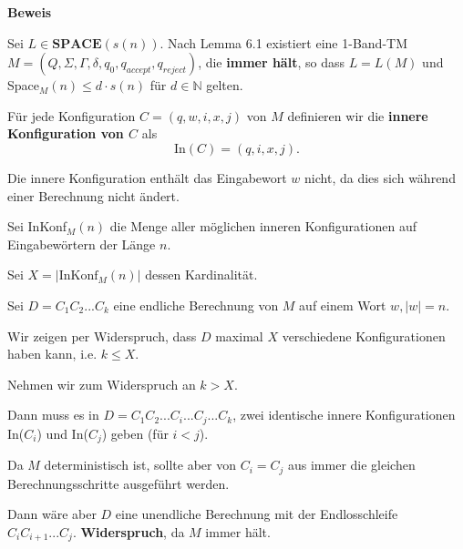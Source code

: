 \documentclass[a4paper, 11pt]{article}
\def\N{\mathbb{N}}
\begin{document}
                            \textbf{Beweis}
                        
                            Sei $L \in \textbf{SPACE}(s(n))$. Nach Lemma 6.1 existiert eine 1-Band-TM 
                            $M=(Q,\Sigma,\Gamma,\delta,q_0,q_{accept},q_{reject})$, die \textbf{immer hält}, 
                            so dass $L = L(M)$ und Space$_M(n) \leq d \cdot s(n)$ für $d \in \N$ gelten. 
                         
                            Für jede Konfiguration $C =(q,w,i,x,j)$ von $M$ definieren wir die 
                            \textbf{innere Konfiguration von $C$} als $$\text{In}(C) = (q,i,x,j).$$ 
                            
                            
                            Die innere Konfiguration enthält das Eingabewort $w$ nicht, da dies sich während einer Berechnung nicht ändert. 
                        
                            Sei InKonf$_M(n)$ die Menge aller möglichen inneren Konfigurationen auf Eingabewörtern der Länge $n$.
                        
                            Sei $X = |\text{InKonf}_M(n)|$ dessen Kardinalität.
                        
                            
                            Sei $D = C_1C_2...C_k$ eine endliche Berechnung von $M$ auf einem Wort $w, |w|=n$.
                        
                            
                            Wir zeigen per Widerspruch, dass $D$ maximal $X$ verschiedene Konfigurationen haben kann, i.e. $k \leq X$.
                        
                            
                            Nehmen wir zum Widerspruch an $k > X$.
                        
                            
                            Dann muss es in $D = C_1C_2...C_i...C_j...C_k$, zwei identische innere Konfigurationen In($C_i$) und In($C_j$) geben (für $i < j$).
                            
                            
                            Da $M$ deterministisch ist, sollte aber von $C_i = C_j$ aus immer die gleichen Berechnungsschritte ausgeführt werden.
                        
                             
                            Dann wäre aber $D$ eine unendliche Berechnung mit der Endlosschleife $C_iC_{i+1}...C_j$. \textbf{Widerspruch}, da $M$ immer hält.
                        
\end{document}
